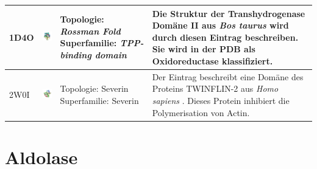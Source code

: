 \documentclass{article}
\begin{document}
\begin{table}
\begin{center}
\begin{tabular}{ | C{9mm} | C{30mm} | C{29mm} | C{38mm} | }
1D4O  & \includegraphics[width=30mm, trim= -10 -5 -5 -10]{1D4O_bio_r_500.jpg}  & Topologie: \newline \textit{Rossman Fold} \newline Superfamilie: \newline \textit{TPP-binding domain} & Die Struktur der Transhydrogenase Dom\"ane II aus \textit{Bos taurus} \cite{1d4o} wird durch diesen Eintrag beschreiben. Sie wird in der PDB als Oxidoreductase klassifiziert. \\ \hline
2W0I  & \includegraphics[width=30mm, trim= -10 -5 -5 -10]{2W0I_bio_r_500.jpg} & Topologie: \newline Severin \newline Superfamilie: \newline Severin & Der Eintrag beschreibt eine Dom\"ane des Proteins TWINFLIN-2 aus \textit{Homo sapiens} \cite{2woi}. Dieses Protein inhibiert die Polymerisation von Actin. \\ 
\hline


\end{tabular}
\end{center}
\end{table}

\section{Aldolase}
\end{document}
